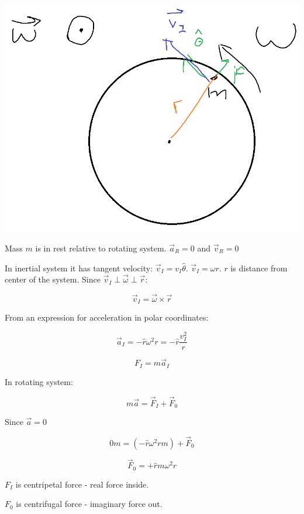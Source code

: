 \begin{center}
	\includegraphics[width=\linewidth]{./lect5/pic2.png}
\end{center}


Mass $m$ is in rest relative to rotating system. $\vec{a}_R = 0$ and $\vec{v}_R = 0$

In inertial system it has tangent velocity: $\vec{v}_I = v_I \hat{\theta}$. $\vec{v}_I = \omega r$. $r$ is distance from center of the system. Since $\vec{v}_I \perp \vec{\omega} \perp \vec{r}$:

$$\vec{v}_I = \vec{\omega} \times \vec{r}$$

From an expression for acceleration in polar coordinates:

$$\vec{a}_I = -\hat{r}\omega^2 r = -\hat{r} \frac{v_I^2}{r}$$

$$F_I = m \vec{a}_I$$

In rotating system:

$$m\vec{a} = \vec{F}_I + \vec{F}_0$$

Since $\vec{a} = 0$

$$0m = (-\hat{r} \omega^2 r m) + \vec{F}_0$$

$$\vec{F}_0 = + \hat{r} m \omega^2 r$$

$F_I$ is centripetal force - real force inside.

$F_0$ is centrifugal force - imaginary force out.


